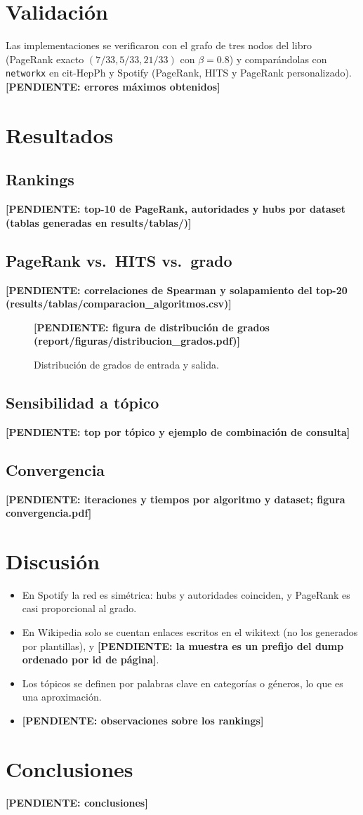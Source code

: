 \documentclass[11pt,a4paper]{article}
\newcommand{\pend}[1]{\textcolor{red!70!black}{\textbf{[PENDIENTE: #1]}}}
\begin{document}
\section{Validación}
Las implementaciones se verificaron con el grafo de tres nodos del libro (PageRank exacto $(7/33, 5/33, 21/33)$ con $\beta=0.8$) y comparándolas con \texttt{networkx} en cit-HepPh y Spotify (PageRank, HITS y PageRank personalizado). \pend{errores máximos obtenidos}

\section{Resultados}
\subsection{Rankings}
\pend{top-10 de PageRank, autoridades y hubs por dataset (tablas generadas en results/tablas/)}

\subsection{PageRank vs.\ HITS vs.\ grado}
\pend{correlaciones de Spearman y solapamiento del top-20 (results/tablas/comparacion\_algoritmos.csv)}

\begin{figure}[h]
\centering
\pend{figura de distribución de grados (report/figuras/distribucion\_grados.pdf)}
\caption{Distribución de grados de entrada y salida.}
\end{figure}

\subsection{Sensibilidad a tópico}
\pend{top por tópico y ejemplo de combinación de consulta}

\subsection{Convergencia}
\pend{iteraciones y tiempos por algoritmo y dataset; figura convergencia.pdf}

\section{Discusión}
\begin{itemize}
  \item En Spotify la red es simétrica: hubs y autoridades coinciden, y PageRank es casi proporcional al grado.
  \item En Wikipedia solo se cuentan enlaces escritos en el wikitext (no los generados por plantillas), y \pend{la muestra es un prefijo del dump ordenado por id de página}.
  \item Los tópicos se definen por palabras clave en categorías o géneros, lo que es una aproximación.
  \item \pend{observaciones sobre los rankings}
\end{itemize}

\section{Conclusiones}
\pend{conclusiones}



\end{document}
